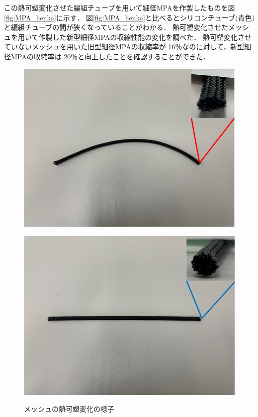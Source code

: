 この熱可塑変化させた編組チューブを用いて細径MPAを作製したものを図\ref{fig:MPA_henka}に示す．
図\ref{fig:MPA_henka}と比べるとシリコンチューブ(青色)と編組チューブの間が狭くなっていることがわかる．
熱可塑変化させたメッシュを用いて作製した新型細径MPAの収縮性能の変化を調べた．
熱可塑変化させていないメッシュを用いた旧型細径MPAの収縮率が 16％なのに対して，新型細径MPAの収縮率は 20％と向上したことを確認することができた．
%
\begin{figure}[ht]
  \begin{minipage}{0.49\hsize}
    \centering  
    \includegraphics[scale=0.25]{image/messhu_hikaku_1.jpg}
    \label{fig:messhu_1}
  \end{minipage}
  \begin{minipage}{0.49\hsize}
    \centering
    \includegraphics[scale=0.25]{image/messhu_hikaku_2.jpg}
    \label{fig:messhu_2}
  \end{minipage}
  \caption{メッシュの熱可塑変化の様子}
  \label{fig:messhu_henka}
\end{figure}
